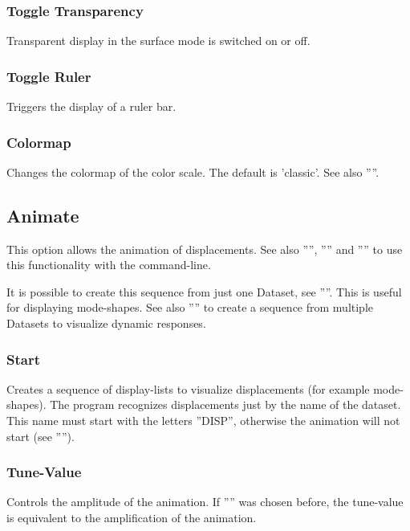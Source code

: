 \documentclass{article}
\begin{document}
\subsubsection{\label{Toggle Transparency}Toggle Transparency}
Transparent display in the surface mode is switched on or off.

\subsubsection{\label{Toggle Ruler}Toggle Ruler}
Triggers the display of a ruler bar.

\subsubsection{\label{Colormap}Colormap}
Changes the colormap of the color scale. The default is 'classic'. See also ''''.

\subsection{\label{animation}Animate}
This option allows the animation of displacements. See also '''', '''' and '''' to use this functionality with the command-line.

It is possible to create this sequence from just one Dataset, see ''''. This is useful for displaying mode-shapes. See also '''' to create a sequence from multiple Datasets to visualize dynamic responses.
   
\subsubsection{\label{Start}Start}
Creates a sequence of display-lists to visualize displacements (for example mode-shapes). The program recognizes displacements just by the name of the dataset. This name must start with the letters ''DISP'', otherwise the animation will not start (see '''').

\subsubsection{\label{Tune-Value}Tune-Value}
Controls the amplitude of the animation. If '''' was chosen before, the tune-value is equivalent to the amplification of the animation. 
\end{document}
